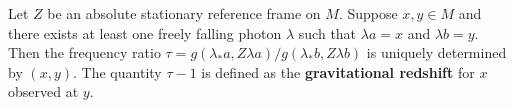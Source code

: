 Let $Z$ be an absolute stationary reference frame on $M$. Suppose $x, y \in M$ and there exists at least one freely falling photon $\lambda$ such that $\lambda a = x$ and $\lambda b = y$. Then the frequency ratio $\tau = g(\lambda_*a, Z\lambda a)/g(\lambda_*b, Z\lambda b)$ is uniquely determined by $(x, y)$. The quantity $\tau - 1$ is defined as the \textbf{gravitational redshift} for $x$ observed at $y$.
